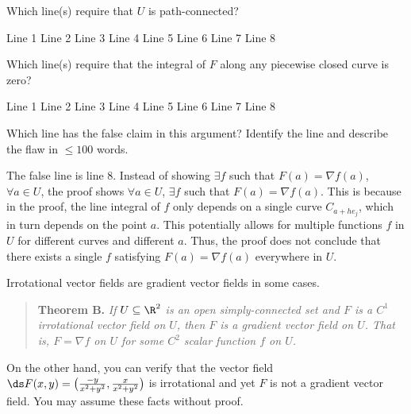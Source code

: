 \documentclass{exam}
\begin{document}
\begin{questions}
\begin{parts}
\item Which line(s) require that $U$ is path-connected? 

\CorrectChoiceBox
\begin{oneparcheckboxes}
	\CorrectChoice Line 1
	\choice Line 2
	\choice Line 3
	\choice Line 4
	\choice Line 5		
	\choice Line 6		
	\choice Line 7		
	\choice Line 8							
\end{oneparcheckboxes}
\medskip

\item Which line(s) require that the integral of $F$ along any piecewise closed curve is zero?

\CorrectChoiceBox
\begin{oneparcheckboxes}
	\choice Line 1
	\choice Line 2
	\choice Line 3
	\choice Line 4
	\CorrectChoice Line 5		
	\choice Line 6		
	\choice Line 7		
	\choice Line 8							
\end{oneparcheckboxes}
\medskip

\item Which line has the false claim in this argument? Identify the line and describe the flaw in  $\leq 100$ words. 

\begin{answer}{130pt}
The false line is line 8. Instead of showing $\exists f$ such that $F(a) = \nabla f(a)$, $\forall a \in U$, the proof shows $\forall a \in U$, $\exists f$ such that $F(a) = \nabla f(a)$. This is because in the proof, the line integral of $f$ only depends on a single curve $C_{a+he_j}$, which in turn depends on the point $a$. This potentially allows for multiple functions $f$ in $U$ for different curves and different $a$. Thus, the proof does not conclude that there exists a single $f$ satisfying $F(a) = \nabla f(a)$ everywhere in $U$.
\end{answer}


\end{parts}


 
\pagebreak
\question \label{Irrotational} Irrotational vector fields are gradient vector fields in some cases. 
\begin{quote}
	\textbf{Theorem B.} \it If $U \subseteq \R^2$ is an open simply-connected set and $F$ is a $C^1$ irrotational vector field on  $U$, then $F$ is a gradient vector field on $U$. That is, $F = \nabla f$ on $U$ for some $C^2$ scalar function $f$ on $U$. 
\end{quote} 
On the other hand, you can verify that the vector field $ \ds F(x,y) = \big( \tfrac{-y}{x^2+y^2} , \tfrac{x}{x^2+y^2} \big)$ is irrotational and yet  $F$ is not a gradient vector field.  You may assume these facts without proof. 
\begin{parts}


\end{parts}
\end{questions}
\end{document}
